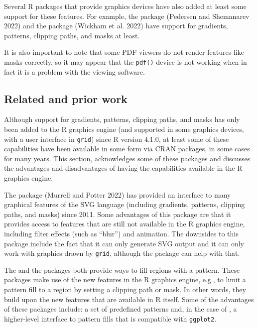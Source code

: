 Several R packages that provide graphics devices have also added at least
some support for these features. For example, the  package
(Pedersen and Shemanarev 2022)
and the  package (Wickham et al. 2022)
have support for gradients, patterns, clipping paths, and masks at least.

It is also important to note that
some PDF viewers do not render features like masks correctly,
so it may appear that the \texttt{pdf()} device is not working when in fact
it is a problem with the viewing software.

\hypertarget{related-and-prior-work}{%
\subsection{Related and prior work}\label{related-and-prior-work}}

Although support for gradients, patterns, clipping paths, and masks
has only been added to the R graphics engine (and supported
in some graphics devices, with a user interface in \texttt{grid}) since
R version 4.1.0,
at least some of these capabilities have been available in
some form via CRAN packages, in some cases for many years.
This section, acknowledges some of these packages and discusses
the advantages and disadvantages of having the capabilities
available in the R graphics engine.

The  package (Murrell and Potter 2022) has
provided an interface to many graphical features of the SVG language
(including gradients, patterns, clipping paths, and masks)
since 2011.
Some advantages of this package are that it provides access to
features that are still not available in the R graphics engine,
including filter effects (such as ``blur'') and animation.
The downsides to this package include the fact that
it can only generate SVG output and it
can only work with graphics drawn by \texttt{grid}, although the
 package can help with that.

The  and
the  packages both provide ways to fill regions
with a pattern. These packages make use of the
new features in the R graphics engine, e.g., to limit a pattern fill
to a region by setting a clipping path or mask. In other words, they
build upon the new features that are available in R itself.
Some of the advantages of these packages include:
a set of predefined patterns and, in the case of ,
a higher-level interface to pattern fills that is compatible with
\texttt{ggplot2}.

